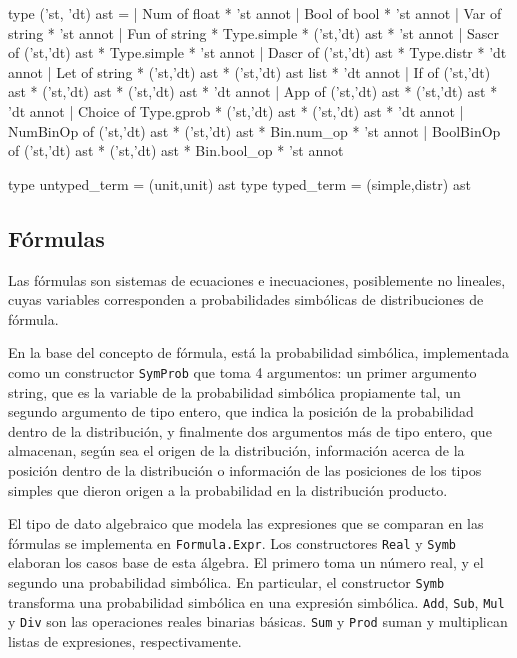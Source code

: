 \begin{ocamlblock}[caption={AST lenguaje fuente},label={lst:lst:src-ast}]
type ('st, 'dt) ast =
| Num       of float * 'st annot
| Bool      of bool * 'st annot 
| Var       of string * 'st annot
| Fun       of string * Type.simple * ('st,'dt) ast * 'st annot
| Sascr     of ('st,'dt) ast * Type.simple * 'st annot
| Dascr     of ('st,'dt) ast * Type.distr * 'dt annot
| Let       of string * ('st,'dt) ast * ('st,'dt) ast list * 'dt annot 
| If        of ('st,'dt) ast * ('st,'dt) ast * ('st,'dt) ast * 'dt annot
| App       of ('st,'dt) ast * ('st,'dt) ast * 'dt annot 
| Choice    of Type.gprob * ('st,'dt) ast * ('st,'dt) ast * 'dt annot 
| NumBinOp  of ('st,'dt) ast * ('st,'dt) ast *  Bin.num_op * 'st annot 
| BoolBinOp of ('st,'dt) ast * ('st,'dt) ast * Bin.bool_op * 'st annot 

type untyped_term = (unit,unit) ast
type typed_term   = (simple,distr) ast\end{ocamlblock}

\subsection{Fórmulas}
Las fórmulas son sistemas de ecuaciones e inecuaciones, posiblemente no
lineales, cuyas variables corresponden a probabilidades simbólicas de
distribuciones de fórmula.

En la base del concepto de fórmula, está la
probabilidad simbólica, implementada como un constructor \verb|SymProb| que toma
4 argumentos: un primer argumento string, que es la variable de la probabilidad
simbólica propiamente tal, un segundo argumento de tipo entero, que indica la
posición de la probabilidad dentro de la distribución, y finalmente dos
argumentos más de tipo entero, que almacenan, según sea el origen de la
distribución, información acerca de la posición dentro de la distribución o
información de las posiciones de los tipos simples que dieron origen a la
probabilidad en la distribución producto.

El tipo de dato algebraico que modela las expresiones que se comparan en las
fórmulas se implementa en \verb|Formula.Expr|. Los constructores \verb|Real| y
\verb|Symb| elaboran los casos base de esta álgebra. El primero toma un número real, y el segundo una probabilidad
simbólica. En particular, el
constructor \verb|Symb| transforma una probabilidad simbólica en una expresión
simbólica. \verb|Add|, \verb|Sub|, \verb|Mul| y \verb|Div| son las operaciones
reales binarias básicas. \verb|Sum| y \verb|Prod| suman y multiplican listas de
expresiones, respectivamente.

